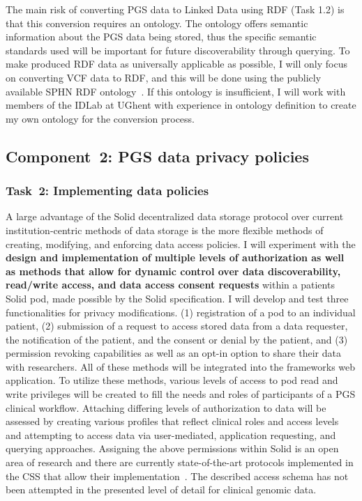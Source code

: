 \documentclass[a4paper,11pt]{article}
\begin{document}
\begin{refsection}
The main risk of converting PGS data to Linked Data using RDF (Task 1.2) is that this conversion requires an ontology. 
The ontology offers semantic information about the PGS data being stored, thus the specific semantic standards used will be important for future discoverability through querying. 
To make produced RDF data as universally applicable as possible, I will only focus on converting VCF data to RDF, and this will be done using the publicly available SPHN RDF ontology~\cite{sphn_rdf_2023}.
If this ontology is insufficient, I will work with members of the IDLab at UGhent with experience in ontology definition to create my own ontology for the conversion process.


\newcommand\WPb{PGS data privacy policies}
\subsection{Component~2: \WPb}

\newcommand\WPba{Implementing data policies}
\subsubsection{Task~2: \WPba}
A large advantage of the Solid decentralized data storage protocol over current institution-centric methods of data storage is the more flexible methods of creating, modifying, and enforcing data access policies. 
I will experiment with the \textbf{design and implementation of multiple levels of authorization as well as methods that allow for dynamic control over data discoverability, read/write access, and data access consent requests} within a patient\textquotesingle s Solid pod, made possible by the Solid specification. 
I will develop and test three functionalities for privacy modifications.
(1) registration of a pod to an individual patient,
(2) submission of a request to access stored data from a data requester, the notification of the patient, and the consent or denial by the patient, and
(3) permission revoking capabilities as well as an opt-in option to share their data with researchers. 
All of these methods will be integrated into the framework\textquotesingle s web application.
To utilize these methods, various levels of access to pod read and write privileges will be created to fill the needs and roles of participants of a PGS clinical workflow. 
Attaching differing levels of authorization to data will be assessed by creating various profiles that reflect clinical roles and access levels and attempting to access data via user-mediated, application requesting, and querying approaches. 
Assigning the above permissions within Solid is an open area of research and there are currently state-of-the-art protocols implemented in the CSS that allow their implementation~\cite{css}.
The described access schema has not been attempted in the presented level of detail for clinical genomic data.


\end{refsection}
\end{document}
